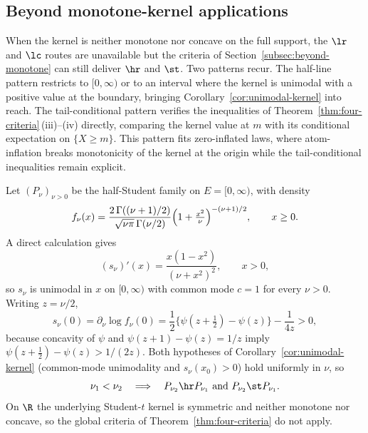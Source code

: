 \documentclass[11pt]{article}
\begin{document}
\subsection{Beyond monotone-kernel applications}
\label{sec:beyond-monotone-applications}

When the kernel is neither monotone nor concave on the full support, the \(\lr\) and \(\lc\) routes are unavailable but the criteria of Section~\ref{subsec:beyond-monotone} can still deliver \(\hr\) and \(\st\). Two patterns recur. The half-line pattern restricts to \([0,\infty)\) or to an interval where the kernel is unimodal with a positive value at the boundary, bringing Corollary~\ref{cor:unimodal-kernel} into reach. The tail-conditional pattern verifies the inequalities of Theorem~\ref{thm:four-criteria}\,\textup{(iii)}--\textup{(iv)} directly, comparing the kernel value at \(m\) with its conditional expectation on \(\{X\ge m\}\). This pattern fits zero-inflated laws, where atom-inflation breaks monotonicity of the kernel at the origin while the tail-conditional inequalities remain explicit.

\begin{example}
\label{ex:half-student-family}
Let \((P_\nu)_{\nu>0}\) be the half-Student family on \(E=[0,\infty)\), with density
\[
f_\nu(x) =\frac{2\,\Gamma((\nu+1)/2)}{\sqrt{\nu\pi}\,\Gamma(\nu/2)} \Bigl(1+\tfrac{x^2}{\nu}\Bigr)^{-(\nu+1)/2}, \qquad x\ge 0.
\]
A direct calculation gives
\[
(s_\nu)'(x)=\frac{x(1-x^2)}{(\nu+x^2)^2}, \qquad x>0,
\]
so \(s_\nu\) is unimodal in \(x\) on \([0,\infty)\) with common mode \(c=1\) for every \(\nu>0\). Writing \(z=\nu/2\),
\[
s_\nu(0)=\partial_\nu\log f_\nu(0) =\frac12\{\psi(z+\tfrac12)-\psi(z)\}-\frac{1}{4z}>0,
\]
because concavity of \(\psi\) and \(\psi(z+1)-\psi(z)=1/z\) imply \(\psi(z+\tfrac12)-\psi(z)>1/(2z)\). Both hypotheses of Corollary~\ref{cor:unimodal-kernel} (common-mode unimodality and \(s_\nu(x_0)>0\)) hold uniformly in \(\nu\), so
\[
\nu_1<\nu_2 \quad\Longrightarrow\quad P_{\nu_2}\hr P_{\nu_1} \text{ and } P_{\nu_2}\st P_{\nu_1}.
\]
On \(\R\) the underlying Student-\(t\) kernel is symmetric and neither monotone nor concave, so the global criteria of Theorem~\ref{thm:four-criteria} do not apply. 
\end{example}
\end{document}
